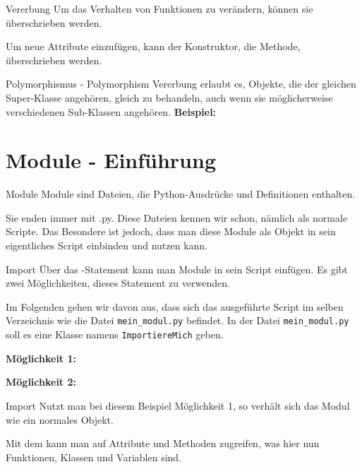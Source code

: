 \begin{frame}{Vererbung}
	Um das Verhalten von Funktionen zu verändern, können sie überschrieben werden.
	
	
	Um neue Attribute einzufügen, kann der Konstruktor, die  Methode, überschrieben werden.
	
\end{frame}

\begin{frame}{Polymorphismus - Polymorphism}
	Vererbung erlaubt es, Objekte, die der gleichen Super-Klasse angehören, gleich zu behandeln, auch wenn sie möglicherweise verschiedenen Sub-Klassen angehören.\linebreak
	\textbf{Beispiel:}
	
\end{frame}

\section{Module - Einführung}
\begin{frame}{Module}
	Module sind Dateien, die Python-Ausdrücke und Definitionen enthalten. 
	
	Sie enden immer mit \alert{.py}. Diese Dateien kennen wir schon, nämlich als normale Scripte. Das Besondere ist jedoch, dass man diese Module als Objekt in sein eigentliches Script einbinden und nutzen kann.
	
\end{frame}

\begin{frame}{Import}
	Über das -Statement kann man Module in sein Script einfügen. Es gibt zwei Möglichkeiten, dieses Statement zu verwenden.
	
	 Im Folgenden gehen wir davon aus, dass sich das ausgeführte Script im selben Verzeichnis wie die Datei \texttt{mein\_modul.py} befindet. In der Datei \texttt{mein\_modul.py} soll es eine Klasse namens \texttt{ImportiereMich} geben.
	 \pause
	
	\textbf{Möglichkeit 1:}
		
		\pause
	\textbf{Möglichkeit 2:}
		
	
\end{frame}

\begin{frame}{Import}
	Nutzt man bei diesem Beispiel Möglichkeit 1, so verhält sich das Modul wie ein normales Objekt.
	
	Mit dem  kann man auf Attribute und Methoden zugreifen, was hier nun Funktionen, Klassen und Variablen sind.
	
\end{frame}

